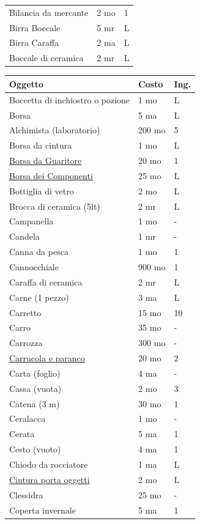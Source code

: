 \begin{multicols}{2}
\begin{tabularx}{\linewidth}{Xll}
Bilancia da mercante& 2 mo& 1\\
Birra Boccale& 5 mr& L\\
Birra Caraffa & 2 ma & L\\
Boccale di ceramica & 2 mr & L \\
\end{tabularx}
\noindent\begin{tabular}{p{5cm}p{1.5cm}p{0.7cm}}
\toprule
\textbf{Oggetto} & \textbf{Costo} & \textbf{Ing.} \\
\toprule
Boccetta di inchiostro o pozione & 1 mo & L\\
Borsa & 5 ma & L \\
Alchimista (laboratorio) & 200 mo & 5 \\
Borsa da cintura & 1 mo & L \\
\hyperlink{borsadaguaritore}{Borsa da Guaritore} & 20 mo & 1 \\
\hyperlink{Borsa dei Componenti}{Borsa dei Componenti} & 25 mo & L \\
Bottiglia di vetro & 2 mo & L \\
Brocca di ceramica (5lt) & 2 mr & L \\
Campanella & 1 mo & - \\
Candela & 1 mr & - \\
Canna da pesca & 1 mo & 1 \\
Cannocchiale & 900 mo & 1 \\
Caraffa di ceramica & 2 mr & L \\
Carne (1 pezzo) & 3 ma & L \\
Carretto & 15 mo & 10 \\
Carro & 35 mo & - \\
Carrozza & 300 mo & - \\
\hyperlink{Carrucola e paranco}{Carrucola e paranco} & 20 mo & 2 \\
Carta (foglio) & 4 ma & - \\
Cassa (vuota) & 2 mo & 3 \\
Catena (3 m) & 30 mo & 1 \\
Ceralacca & 1 mo & - \\
Cerata & 5 ma & 1 \\
Cesto (vuoto) & 4 ma & 1 \\
Chiodo da rocciatore & 1 ma & L \\
\hyperlink{Cintura porta oggetti}{Cintura porta oggetti} & 2 mo & L \\
Clessidra & 25 mo & - \\
Coperta invernale & 5 ma & 1 \\

\end{tabular}
\end{multicols}
